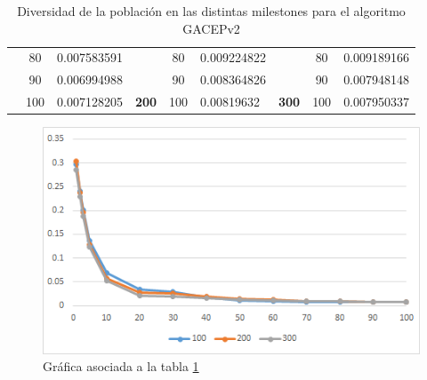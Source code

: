 \begin{table}[h]
\begin{tabular}{|cclcclccl|}
\rowcolor[HTML]{DDFDFF} 
\multicolumn{1}{|c|}{\cellcolor[HTML]{FFFFC7}}                                & \multicolumn{1}{c|}{\cellcolor[HTML]{DDFDFF}80}        & \multicolumn{1}{l|}{\cellcolor[HTML]{DDFDFF}0.007583591} & \multicolumn{1}{c|}{\cellcolor[HTML]{FFFFC7}}                                & \multicolumn{1}{c|}{\cellcolor[HTML]{DDFDFF}80}        & \multicolumn{1}{l|}{\cellcolor[HTML]{DDFDFF}0.009224822} & \multicolumn{1}{c|}{\cellcolor[HTML]{FFFFC7}}                                & \multicolumn{1}{c|}{\cellcolor[HTML]{DDFDFF}80}        & 0.009189166 \\ \cline{2-3} \cline{5-6} \cline{8-9} 
\rowcolor[HTML]{DAE8FC} 
\multicolumn{1}{|c|}{\cellcolor[HTML]{FFFFC7}}                                & \multicolumn{1}{c|}{\cellcolor[HTML]{DAE8FC}90}        & \multicolumn{1}{l|}{\cellcolor[HTML]{DAE8FC}0.006994988} & \multicolumn{1}{c|}{\cellcolor[HTML]{FFFFC7}}                                & \multicolumn{1}{c|}{\cellcolor[HTML]{DAE8FC}90}        & \multicolumn{1}{l|}{\cellcolor[HTML]{DAE8FC}0.008364826} & \multicolumn{1}{c|}{\cellcolor[HTML]{FFFFC7}}                                & \multicolumn{1}{c|}{\cellcolor[HTML]{DAE8FC}90}        & 0.007948148 \\ \cline{2-3} \cline{5-6} \cline{8-9} 
\rowcolor[HTML]{DDFDFF} 
\multicolumn{1}{|c|}{\multirow{-14}{*}{\cellcolor[HTML]{FFFFC7}\textbf{100}}} & \multicolumn{1}{c|}{\cellcolor[HTML]{DDFDFF}100}       & \multicolumn{1}{l|}{\cellcolor[HTML]{DDFDFF}0.007128205} & \multicolumn{1}{c|}{\multirow{-14}{*}{\cellcolor[HTML]{FFFFC7}\textbf{200}}} & \multicolumn{1}{c|}{\cellcolor[HTML]{DDFDFF}100}       & \multicolumn{1}{l|}{\cellcolor[HTML]{DDFDFF}0.00819632}  & \multicolumn{1}{c|}{\multirow{-14}{*}{\cellcolor[HTML]{FFFFC7}\textbf{300}}} & \multicolumn{1}{c|}{\cellcolor[HTML]{DDFDFF}100}       & 0.007950337 \\ \hline
\end{tabular}
\caption{\label{GACEPv2Diversity}Diversidad de la población en las distintas milestones para el algoritmo GACEPv2}
\end{table}

\begin{figure}[h]
		\centering
		\includegraphics[scale=1]{imagenes/Experimental/GACEPv2_Diversity.png}
        \caption{Gráfica asociada a la tabla \ref{GACEPv2Diversity}}
        \label{fig:GACEPv2_Diversity}
\end{figure}

